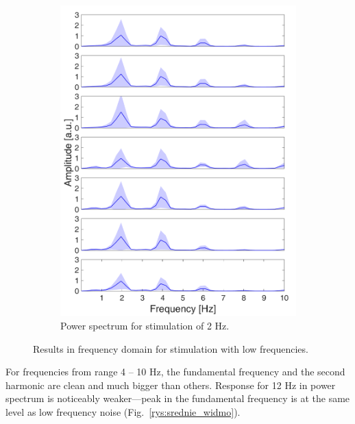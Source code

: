\documentclass{pracalicmgr}
\begin{document}
\begin{figure}[H]
\begin{subfigure}{.5\textwidth}
		\includegraphics[width=1.\linewidth]{widmo_2Hz.png}
		\caption{Power spectrum for stimulation of 2 Hz.}
		\label{rys:widmo_2Hz}
    	\end{subfigure}
    	\caption{Results in frequency domain for stimulation with low frequencies.}
    	\label{rys:widmo_1_2}
    \end{figure}
    
    For frequencies from range 4 -- 10 Hz, the fundamental frequency and the second harmonic are clean and much bigger than others. Response for 12 Hz in power spectrum is noticeably weaker---peak in the fundamental frequency is at the same level as low frequency noise (Fig.~\ref{rys:srednie_widmo}).
    
\end{document}

